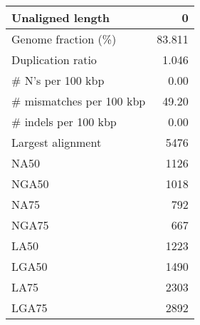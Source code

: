 \documentclass[12pt,a4paper]{article}
\begin{document}
\begin{table}[ht]
\begin{center}
\begin{tabular}{|l*{1}{|r}|}
Unaligned length & 0 \\ \hline
Genome fraction (\%) & 83.811 \\ \hline
Duplication ratio & 1.046 \\ \hline
\# N's per 100 kbp & 0.00 \\ \hline
\# mismatches per 100 kbp & 49.20 \\ \hline
\# indels per 100 kbp & 0.00 \\ \hline
Largest alignment & 5476 \\ \hline
NA50 & 1126 \\ \hline
NGA50 & 1018 \\ \hline
NA75 & 792 \\ \hline
NGA75 & 667 \\ \hline
LA50 & 1223 \\ \hline
LGA50 & 1490 \\ \hline
LA75 & 2303 \\ \hline
LGA75 & 2892 \\ \hline
\end{tabular}
\end{center}
\end{table}
\end{document}
